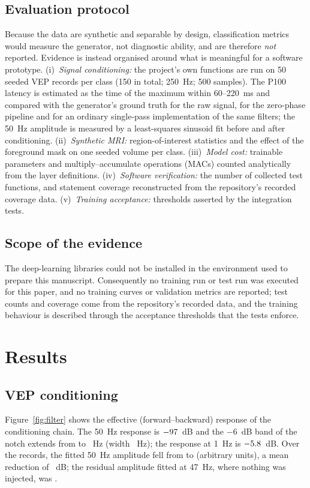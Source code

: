 \documentclass{ieeeaccessapprox}
\begin{document}
\subsection{Evaluation protocol}
Because the data are synthetic and separable by design, classification metrics would measure the generator, not diagnostic ability, and are therefore \emph{not} reported. Evidence is instead organised around what is meaningful for a software prototype. (i)~\emph{Signal conditioning:} the project's own functions are run on 50 seeded VEP records per class (150 in total; 250~Hz; 500 samples). The P100 latency is estimated as the time of the maximum within 60--220~ms and compared with the generator's ground truth for the raw signal, for the zero-phase pipeline and for an ordinary single-pass implementation of the same filters; the 50~Hz amplitude is measured by a least-squares sinusoid fit before and after conditioning. (ii)~\emph{Synthetic MRI:} region-of-interest statistics and the effect of the foreground mask on one seeded volume per class. (iii)~\emph{Model cost:} trainable parameters and multiply--accumulate operations (MACs) counted analytically from the layer definitions. (iv)~\emph{Software verification:} the number of collected test functions, and statement coverage reconstructed from the repository's recorded coverage data. (v)~\emph{Training acceptance:} thresholds asserted by the integration tests.

\subsection{Scope of the evidence}
The deep-learning libraries could not be installed in the environment used to prepare this manuscript. Consequently no training run or test run was executed for this paper, and no training curves or validation metrics are reported; test counts and coverage come from the repository's recorded data, and the training behaviour is described through the acceptance thresholds that the tests enforce.

\section{Results}\label{sec:results}
\subsection{VEP conditioning}
Figure~\ref{fig:filter} shows the effective (forward--backward) response of the conditioning chain. The 50~Hz response is $-97$~dB and the $-6$~dB band of the notch extends from \notchLo{} to \notchHi{}~Hz (width \notchW{}~Hz); the response at 1~Hz is $-5.8$~dB. Over the \nTrials{} records, the fitted 50~Hz amplitude fell from \ampBefore{} to \ampAfter{} (arbitrary units), a mean reduction of \nMainsDb{}~dB; the residual amplitude fitted at 47~Hz, where nothing was injected, was \noiseRef{}.
\end{document}
